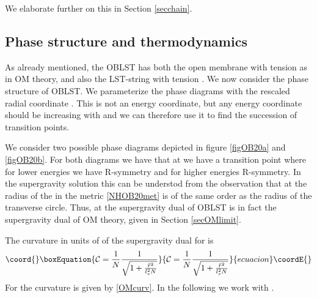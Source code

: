 \documentclass[a4paper,twoside,titlepage,12pt]{article}
\begin{document}
We elaborate further on this in Section \ref{secchain}.

\subsection{Phase structure and thermodynamics}

As already mentioned, the \coordHE{} OBLST has both the open membrane
with tension \coordHE{} as in OM theory, 
and also the LST-string with tension \coordHE{}.
We now consider the phase structure of \coordHE{} OBLST.
We parameterize the phase diagrams with the rescaled radial
coordinate \coordHE{}. This is not an energy coordinate,
but any energy coordinate should be increasing with \coordHE{}
and we can therefore use it to find the succession 
of transition points.

We consider two possible phase diagrams depicted in figure 
\ref{figOB20a} and \ref{figOB20b}.
For both diagrams we have that at \coordHE{}
we have a transition point where for lower energies we have
\coordHE{} R-symmetry and for higher energies \coordHE{} R-symmetry.
In the supergravity solution this can be understod from
the observation that at \coordHE{} the radius
of the \coordHE{} in the metric \eqref{NHOB20met} is of the same
order as the radius \coordHE{} of the transverse circle.
Thus, at \coordHE{} the supergravity dual of \coordHE{}
OBLST is in fact the supergravity dual of OM theory, given in
Section \ref{secOMlimit}.

The curvature in units of \coordHE{} 
of the supergravity dual for \coordHE{} is
%
\begin{equation}\coord{}\boxEquation{
\mathcal{C} = \frac{1}{N} \frac{1}{\sqrt{1+ \frac{\tilde{r}^2}{\lsn^2 N}}}
}{
\mathcal{C} = \frac{1}{N} \frac{1}{\sqrt{1+ \frac{\tilde{r}^2}{\lsn^2 N}}}
}{ecuacion}\coordE{}\end{equation}
%
For \coordHE{} the curvature is given by \eqref{OMcurv}.
In the following we work with \coordHE{}.
\end{document}
